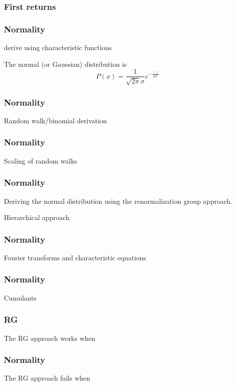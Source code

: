 \begin{frame}
  \frametitle{First returns}


\end{frame}

\begin{frame}
  \frametitle{Normality}

derive using characteristic functions

The normal (or Gaussian) distribution is
$$
P(x) 
=
\frac{1}{\sqrt{2\pi}\sigma}
e^{-\frac{()}{2\sigma^2}}
$$

\end{frame}

\begin{frame}
  \frametitle{Normality}

Random walk/binomial derivation


\end{frame}

\begin{frame}
  \frametitle{Normality}

Scaling of random walks

\end{frame}

\begin{frame}
  \frametitle{Normality}

Deriving the normal distribution using 
the renormalization group approach.

Hierarchical approach

\end{frame}

\begin{frame}
  \frametitle{Normality}

Fourier transforms and
characteristic equations

\end{frame}

\begin{frame}
  \frametitle{Normality}

Cumulants

\end{frame}

\begin{frame}
  \frametitle{RG}

The RG approach works when

\end{frame}

\begin{frame}
  \frametitle{Normality}

The RG approach fails when

\end{frame}

